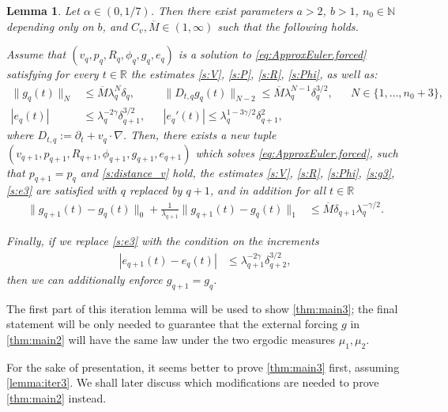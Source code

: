 \documentclass[10pt,a4paper]{amsart}
\numberwithin{equation}{section}
\numberwithin{corollario}{section}
\newtheorem{lemma}{Lemma}
\numberwithin{lemma}{section}
\numberwithin{prop}{section}
\theoremstyle{definition}
\theoremstyle{remark}
\newcommand{\N}{\mathbb{N}}
\newcommand{\R}{\mathbb{R}}
\newcommand{\qq}{_{q+1}}
\newcommand{\qqq}{_{q+2}}
\newcommand{\oM}{\overline{M}}
\begin{document}
\begin{lemma}\label{lemma:iter3}
    Let $\alpha \in (0,1/7)$. Then there exist parameters $a>2$, $b>1$, $n_0\in \N$ depending only on $b$, and $C_v, \oM \in (1,\infty)$ such that the following holds.

   Assume that $(v_q,p_q,R_q,\phi_q,g_q,e_q)$ is a solution to \eqref{eq:ApproxEuler.forced} satisfying for every $t\in \R$ the estimates \eqref{s:V}, \eqref{s:P}, \eqref{s:R}, \eqref{s:Phi}, as well as:
   \begin{align}
        \label{s:g3}
        \|g_q(t)\|_N&\le \overline{M}\lambda_q^N\delta_q,
        &&
        \|D_{t,q}g_q(t)\|_{N-2}\le\overline{M}\lambda_q^{N-1}\delta_q^{3/2},
        &&
        N \in \{1,\dots,n_0+3\},
        \\
        \label{s:e3}
        |e_q (t)| 
        &\leq \lambda_{q}^{-2\gamma} \delta\qq^{3/2},
        &&
        |e_q' (t)| 
        \leq \lambda_{q}^{1-3\gamma/2} \delta\qq^{2},
   \end{align}
where $D_{t,q}:=\partial_t+v_q\cdot \nabla$.
Then, there exists a new tuple $(v\qq,p\qq,R\qq,\phi\qq,g\qq,e\qq)$ which solves \eqref{eq:ApproxEuler.forced}, such that $p\qq=p_q$ and \eqref{s:distance_v} hold, the estimates \eqref{s:V}, \eqref{s:R}, \eqref{s:Phi},  \eqref{s:g3}, \eqref{s:e3} are satisfied with $q$ replaced by $q+1$, and in addition for all $t\in \R$ 
   \begin{align}
       \label{s:distance.g}
       \|g_{q+1}(t)-g_q(t)\|_{0}+ \frac{1}{\lambda\qq}\|g_{q+1}(t)-g_q(t)\|_{1}
       &\le 
       \oM\delta_{q+1} \lambda_q^{-\gamma/2}.
   \end{align}

Finally, if we replace \eqref{s:e3} with the condition on the increments
\begin{align}
    \label{s:distance.e3}
        |e_{q+1}(t)-e_q (t)| 
        &\leq \lambda\qq^{-2\gamma} \delta\qqq^{3/2},
\end{align}
then we can additionally enforce $g\qq = g_q$.
\end{lemma}

The first part of this iteration lemma will be used to show \autoref{thm:main3}; the final statement will be only needed to guarantee that the external forcing $g$ in \autoref{thm:main2} will have the same law under the two ergodic measures $\mu_1,\mu_2$.

For the sake of presentation, it seems better to prove \autoref{thm:main3} first, assuming \autoref{lemma:iter3}. 
We shall later discuss which modifications are needed to prove \autoref{thm:main2} instead.
\end{document}
